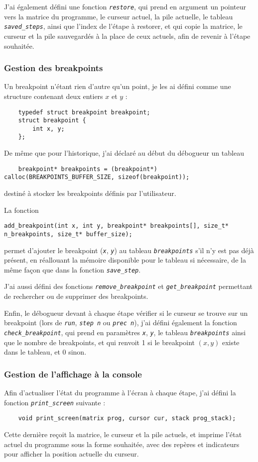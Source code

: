 \documentclass[a4paper,11pt]{article}
\newcommand{\code}[1]{{\itshape\lstinline{#1}}}
\begin{document}
J'ai également défini une fonction \code{restore}, qui prend en argument un pointeur vers la matrice du programme, le curseur actuel, la pile actuelle, le tableau \code{saved_steps}, ainsi que l'index de l'étape à restorer, et qui copie la matrice, le curseur et la pile sauvegardés à la place de ceux actuels, afin de revenir à l'étape souhaitée.

\subsubsection*{Gestion des breakpoints}
Un breakpoint n'étant rien d'autre qu'un point, je les ai défini comme une structure contenant deux entiers $x$ et $y$ :
{\small\begin{lstlisting}
    typedef struct breakpoint breakpoint;
    struct breakpoint {
        int x, y;
    };
\end{lstlisting}}

De même que pour l'historique, j'ai déclaré au début du débogueur un tableau
{\small\begin{lstlisting}
    breakpoint* breakpoints = (breakpoint*) calloc(BREAKPOINTS_BUFFER_SIZE, sizeof(breakpoint));
\end{lstlisting}}
destiné à stocker les breakpoints définis par l'utilisateur.

La fonction
{\small\begin{lstlisting}
add_breakpoint(int x, int y, breakpoint* breakpoints[], size_t* n_breakpoints, size_t* buffer_size);
\end{lstlisting}}
permet d'ajouter le breakpoint (\code{x}, \code{y}) au tableau \code{breakpoints} s'il n'y est pas déjà présent, en réallouant la mémoire disponible pour le tableau si nécessaire, de la même façon que dans la fonction \code{save_step}.

J'ai aussi défini des fonctions \code{remove_breakpoint} et \code{get_breakpoint} permettant de rechercher ou de supprimer des breakpoints.

Enfin, le débogueur devant à chaque étape vérifier si le curseur se trouve sur un breakpoint (lors de \code{run}, \code{step n} ou \code{prec n}), j'ai défini également la fonction \code{check_breakpoint}, qui prend en paramètres \code{x}, \code{y}, le tableau \code{breakpoints} ainsi que le nombre de breakpoints, et qui renvoit 1 si le breakpoint $(x, y)$ existe dans le tableau, et 0 sinon.

\subsubsection*{Gestion de l'affichage à la console}
Afin d'actualiser l'état du programme à l'écran à chaque étape, j'ai défini la fonction \code{print_screen} suivante :
{\begin{lstlisting}
    void print_screen(matrix prog, cursor cur, stack prog_stack);
\end{lstlisting}}
Cette dernière reçoit la matrice, le curseur et la pile actuels, et imprime l'état actuel du programme sous la forme souhaitée, avec des repères et indicateurs pour afficher la position actuelle du curseur.
\end{document}
